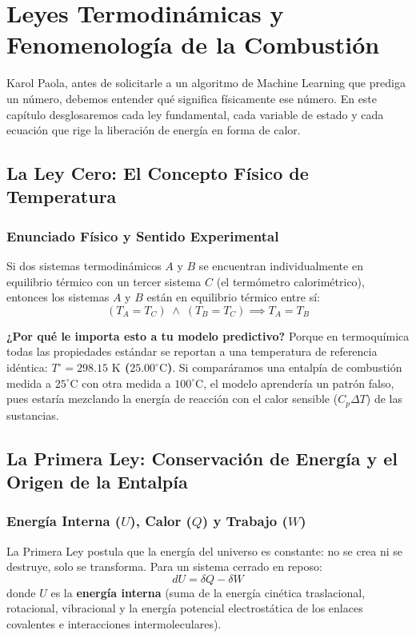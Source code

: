 \documentclass[11pt,letterpaper]{report}
\begin{document}
\newpage

\chapter{Leyes Termodinámicas y Fenomenología de la Combustión}

Karol Paola, antes de solicitarle a un algoritmo de Machine Learning que prediga un número, debemos entender qué significa físicamente ese número. En este capítulo desglosaremos cada ley fundamental, cada variable de estado y cada ecuación que rige la liberación de energía en forma de calor.

\section{La Ley Cero: El Concepto Físico de Temperatura}

\subsection{Enunciado Físico y Sentido Experimental}
Si dos sistemas termodinámicos $A$ y $B$ se encuentran individualmente en equilibrio térmico con un tercer sistema $C$ (el termómetro calorimétrico), entonces los sistemas $A$ y $B$ están en equilibrio térmico entre sí:
\begin{equation}
    (T_A = T_C) \;\land\; (T_B = T_C) \implies T_A = T_B
\end{equation}

\noindent\textbf{¿Por qué le importa esto a tu modelo predictivo?}  
Porque en termoquímica todas las propiedades estándar se reportan a una temperatura de referencia idéntica: \textbf{$T^\circ = 298.15\text{ K}$ ($25.00^\circ\text{C}$)}. Si comparáramos una entalpía de combustión medida a $25^\circ\text{C}$ con otra medida a $100^\circ\text{C}$, el modelo aprendería un patrón falso, pues estaría mezclando la energía de reacción con el calor sensible ($C_p \Delta T$) de las sustancias.

\section{La Primera Ley: Conservación de Energía y el Origen de la Entalpía}

\subsection{Energía Interna ($U$), Calor ($Q$) y Trabajo ($W$)}
La Primera Ley postula que la energía del universo es constante: no se crea ni se destruye, solo se transforma. Para un sistema cerrado en reposo:
\begin{equation}
    dU = \delta Q - \delta W
\end{equation}
donde $U$ es la \textbf{energía interna} (suma de la energía cinética traslacional, rotacional, vibracional y la energía potencial electrostática de los enlaces covalentes e interacciones intermoleculares).
\end{document}
